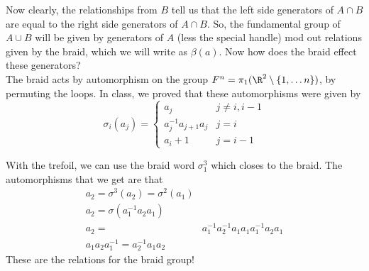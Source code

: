 Now clearly, the relationships from $B$ tell us that the left side generators of $A\cap B$ are equal to the right side generators of $A\cap B$. So, the fundamental group of $A\cup B$ will be given by generators of $A$ (less the special handle) mod out relations given by the braid, which we will write as $\beta(a)$. Now how does the braid effect these generators? \\
The braid acts by automorphism on the group $F^n=\pi_1(\R^2\setminus \{1, \ldots n\})$, by permuting the loops. In class, we proved that these automorphisms were given by 
\[\sigma_i(a_j)=\left\{\begin{array}{cc} a_j & j\neq i,i-1\\
a_j^{-1}a_{j+1}a_j & j=i\\
a_i+1 & j=i-1
\end{array}\right.
\]
\begin{example}
With the trefoil, we can use the braid word $\sigma_1^3$ which closes to the braid. The automorphisms that we get are that 
\begin{align*}
a_2=\sigma^{3}(a_2)=\sigma^2(a_1)\\
a_2=\sigma(a_1^{-1} a_2 a_1)\\
a_2=& a_1^{-1} a_2^{-1} a_1 a_1 a_1^{-1} a_2 a_1\\
a_1 a_2 a_1^{-1}= a_2^{-1} a_1 a_2
\end{align*}
These are the relations for the braid group! 
\end{example}
